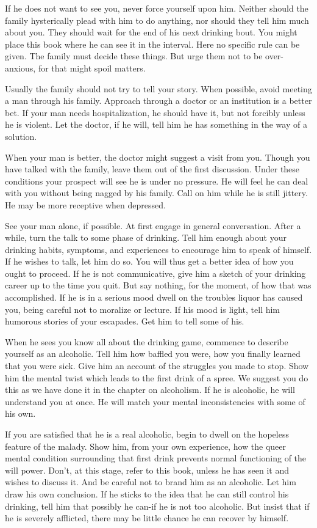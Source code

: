 \begin{biblechapter}
If he does not want to see you, never force yourself upon him.  Neither should the family hysterically plead with him to do anything, nor should they tell him much about you.  They should wait for the end of his next drinking bout.  You might place this book where he can see it in the interval.  Here no specific rule can be given.  The family must decide these things.  But urge them not to be over-anxious, for that might spoil matters.

Usually the family should not try to tell your story.  When possible, avoid meeting a man through his family.  Approach through a doctor or an institution is a better bet.  If your man needs hospitalization, he should have it, but not forcibly unless he is violent.  Let the doctor, if he will, tell him he has something in the way of a solution.

When your man is better, the doctor might suggest a visit from you.  Though you have talked with the family, leave them out of the first discussion.  Under these conditions your prospect will see he is under no pressure.  He will feel he can deal with you without being nagged by his family.  Call on him while he is still jittery.  He may be more receptive when depressed.

See your man alone, if possible.  At first engage in general conversation.  After a while, turn the talk to some phase of drinking.  Tell him enough about your drinking habits, symptoms, and experiences to encourage him to speak of himself.  If he wishes to talk, let him do so.  You will thus get a better idea of how you ought to proceed.  If he is not communicative, give him a sketch of your drinking career up to the time you quit.  But say nothing, for the moment, of how that was accomplished.  If he is in a serious mood dwell on the troubles liquor has caused you, being careful not to moralize or lecture.  If his mood is light, tell him humorous stories of your escapades.  Get him to tell some of his.

When he sees you know all about the drinking game, commence to describe yourself as an alcoholic.  Tell him how baffled you were, how you finally learned that you were sick.  Give him an account of the struggles you made to stop.  Show him the mental twist which leads to the first drink of a spree.  We suggest you do this as we have done it in the chapter on alcoholism.  If he is alcoholic, he will understand you at once.  He will match your mental inconsistencies with some of his own.

If you are satisfied that he is a real alcoholic, begin to dwell on the hopeless feature of the malady.  Show him, from your own experience, how the queer mental condition surrounding that first drink prevents normal functioning of the will power.  Don't, at this stage, refer to this book, unless he has seen it and wishes to discuss it.  And be careful not to brand him as an alcoholic.  Let him draw his own conclusion.  If he sticks to the idea that he can still control his drinking, tell him that possibly he can-if he is not too alcoholic.  But insist that if he is severely afflicted, there may be little chance he can recover by himself.


\end{biblechapter}
